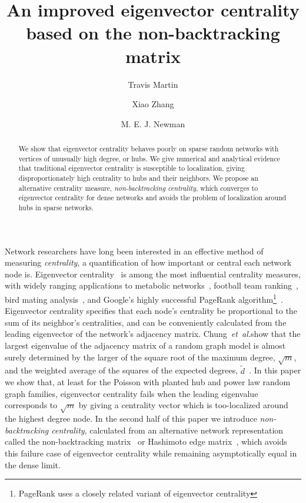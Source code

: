 \documentclass[twocolumn,prl,superscriptaddress]{revtex4}
\newcommand{\etal}{{\it{}et~al.}}
\begin{document}
\title{An improved eigenvector centrality based on the non-backtracking matrix}
\author{Travis Martin}
\author{Xiao Zhang}
\author{M. E. J. Newman}

\begin{abstract}
  We show that eigenvector centrality behaves poorly on sparse random networks with vertices of unusually high degree, or hubs. We give numerical and analytical evidence that traditional eigenvector centrality is susceptible to localization, giving disproportionately high centrality to hubs and their neighbors. We propose an alternative centrality measure, \emph{non-backtracking centrality}, which converges to eigenvector centrality for dense networks and avoids the problem of localization around hubs in sparse networks.
\end{abstract}

\maketitle

Network researchers have long been interested in an effective method of measuring \emph{centrality}, a quantification of how important or central each network node is. Eigenvector centrality~\cite{bonacich72} is among the most influential centrality measures, with widely ranging applications to metabolic networks~\cite{ding10}, football team ranking~\cite{keener93}, bird mating analysis~\cite{ryder08}, and Google's highly successful PageRank algorithm\footnote{PageRank uses a closely related variant of eigenvector centrality}~\cite{brin98}. Eigenvector centrality specifies that each node's centrality be proportional to the sum of its neighbor's centralities, and can be conveniently calculated from the leading eigenvector of the network's adjacency matrix. Chung~\etal show that the largest eigenvalue of the adjacency matrix of a random graph model is almost surely determined by the larger of the square root of the maximum degree, $\sqrt{m}$, and the weighted average of the squares of the expected degrees, $\tilde{d}$~\cite{chung03}. In this paper we show that, at least for the Poisson with planted hub and power law random graph families, eigenvector centrality fails when the leading eigenvalue corresponds to $\sqrt{m}$ by giving a centrality vector which is too-localized around the highest degree node. In the second half of this paper we introduce \emph{non-backtracking centrality}, calculated from an alternative network representation called the non-backtracking matrix~\cite{krzakala13} or Hashimoto edge matrix~\cite{hashimoto89}, which avoids this failure case of eigenvector centrality while remaining asymptotically equal in the dense limit.
\end{document}
